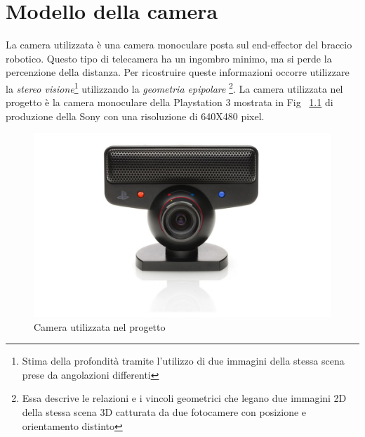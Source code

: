
\chapter{Modello della camera}
\label{chapter2}


La camera utilizzata è una camera monoculare posta sul end-effector del braccio robotico. Questo tipo di telecamera ha un ingombro minimo, ma si perde la percenzione della distanza. Per ricostruire queste informazioni occorre utilizzare la \emph{stereo visione}\footnote{Stima della profondità tramite l'utilizzo di due immagini della stessa scena prese da angolazioni differenti} utilizzando la \emph{geometria epipolare} \footnote{Essa descrive le relazioni e i vincoli geometrici che legano due immagini 2D della stessa scena 3D catturata da due fotocamere con posizione e orientamento distinto}. 
La camera utilizzata nel progetto è la camera monoculare della Playstation 3 mostrata in Fig ~\ref{fig:camera} di produzione della Sony con una risoluzione di 640X480 pixel. 
\begin{figure}[H]
   \centering
   \includegraphics[width=.7\columnwidth]{camera.jpg}
   \caption{Camera utilizzata nel progetto}
   \label{fig:camera} 
\end{figure}


\newpage 
